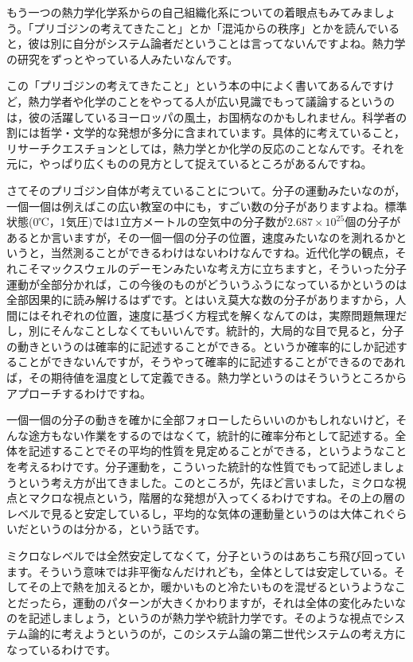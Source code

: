 \documentclass{ltjsbook}
\begin{document}
もう一つの熱力学化学系からの自己組織化系についての着眼点もみてみましょう。「プリゴジンの考えてきたこと」\parencite{Kitahara1999}とか「混沌からの秩序」\parencite{Prigogine}とかを読んでいると，彼は別に自分がシステム論者だということは言ってないんですよね。熱力学の研究をずっとやっている人みたいなんです。

この「プリゴジンの考えてきたこと」という本\parencite{Kitahara1999}の中によく書いてあるんですけど，熱力学者や化学のことをやってる人が広い見識でもって議論するというのは，彼の活躍しているヨーロッパの風土，お国柄なのかもしれません。科学者の割には哲学・文学的な発想が多分に含まれています。具体的に考えていること，リサーチクエスチョンとしては，熱力学とか化学の反応のことなんです。それを元に，やっぱり広くものの見方として捉えているところがあるんですね。

さてそのプリゴジン自体が考えていることについて。分子の運動みたいなのが，一個一個は例えばこの広い教室の中にも，すごい数の分子がありますよね。標準状態(0℃，1気圧)では1立方メートルの空気中の分子数が$2.687\times10^{25}$個の分子があるとか言いますが，その一個一個の分子の位置，速度みたいなのを測れるかというと，当然測ることができるわけはないわけなんですね。近代化学の観点，それこそマックスウェルのデーモンみたいな考え方に立ちますと，そういった分子運動が全部分かれば，この今後のものがどういうふうになっているかというのは全部因果的に読み解けるはずです。とはいえ莫大な数の分子がありますから，人間にはそれぞれの位置，速度に基づく方程式を解くなんてのは，実際問題無理だし，別にそんなことしなくてもいいんです。統計的，大局的な目で見ると，分子の動きというのは確率的に記述することができる。というか確率的にしか記述することができないんですが，そうやって確率的に記述することができるのであれば，その期待値を温度として定義できる。熱力学というのはそういうところからアプローチするわけですね。

一個一個の分子の動きを確かに全部フォローしたらいいのかもしれないけど，そんな途方もない作業をするのではなくて，統計的に確率分布として記述する。全体を記述することでその平均的性質を見定めることができる，というようなことを考えるわけです。分子運動を，こういった統計的な性質でもって記述しましょうという考え方が出てきました。このところが，先ほど言いました，ミクロな視点とマクロな視点という，階層的な発想が入ってくるわけですね。その上の層のレベルで見ると安定しているし，平均的な気体の運動量というのは大体これぐらいだというのは分かる，という話です。

ミクロなレベルでは全然安定してなくて，分子というのはあちこち飛び回っています。そういう意味では非平衡なんだけれども，全体としては安定している。そしてその上で熱を加えるとか，暖かいものと冷たいものを混ぜるというようなことだったら，運動のパターンが大きくかわりますが，それは全体の変化みたいなのを記述しましょう，というのが熱力学や統計力学です。そのような視点でシステム論的に考えようというのが，このシステム論の第二世代システムの考え方になっているわけです。
\end{document}
